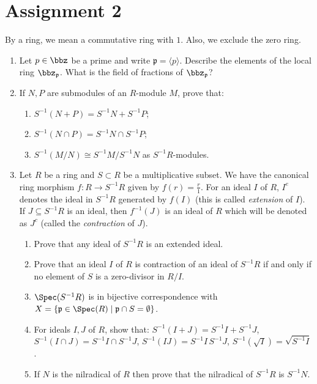 \section{Assignment 2}

\begin{convention}
By a ring, we mean a commutative ring with $1$. Also, we exclude the zero ring.
\end{convention}

\begin{enumerate}[label=\arabic*.]

\item Let $p \in \bbz$ be a prime and write $\mathfrak p = \langle p \rangle$. Describe the elements of the local ring $\bbz_{\mathfrak p}$. What is the field of fractions of $\bbz_{\mathfrak p}$?

\item If $N,P$ are submodules of an $R$-module $M$, prove that:
\begin{enumerate}[label=(\alph*)]
    \item $S^{-1}(N+P) = S^{-1}N + S^{-1}P$;
    \item $S^{-1}(N\cap P) = S^{-1}N \cap S^{-1}P$;
    \item $S^{-1}(M/N) \cong S^{-1}M/S^{-1}N$ as $S^{-1}R$-modules.
\end{enumerate}

\item Let $R$ be a ring and $S \subset R$ be a multiplicative subset. We have the canonical ring morphism $f: R \to S^{-1}R$ given by $f(r) = \frac r1$. For an ideal $I$ of $R$, $I^e$ denotes the ideal in $S^{-1}R$ generated by $f(I)$ (this is called \emph{extension} of $I$). If $J \subseteq S^{-1}R$ is an ideal, then $f^{-1}(J)$ is an ideal of $R$ which will be denoted as $J^c$ (called the \emph{contraction} of $J$).
\begin{enumerate}[label=(\alph*)]
    \item Prove that any ideal of $S^{-1}R$ is an extended ideal.
    \item Prove that an ideal $I$ of $R$ is contraction of an ideal of $S^{-1}R$ if and only if no element of $S$ is a zero-divisor in $R/I$.
    \item $\Spec(S^{-1}R)$ is in bijective correspondence with $X = \{\mathfrak p \in \Spec(R) \mid \mathfrak p \cap S = \emptyset\}$.
    \item For ideals $I,J$ of $R$, show that: $S^{-1}(I+J) = S^{-1}I + S^{-1}J$, $S^{-1}(I \cap J) = S^{-1}I \cap S^{-1}J$, $S^{-1}(IJ) = S^{-1}I\, S^{-1}J$, $S^{-1}(\sqrt I) = \sqrt{S^{-1}I}$.
    \item If $N$ is the nilradical of $R$ then prove that the nilradical of $S^{-1}R$ is $S^{-1}N$.
\end{enumerate}


\end{enumerate}
